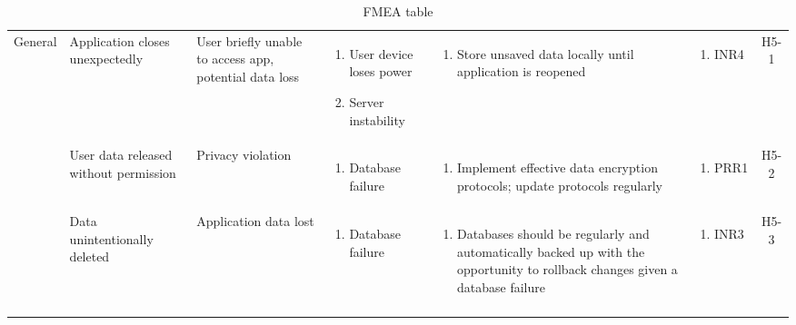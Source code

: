 \documentclass{article}
\begin{document}
\begin{longtable}{|p{1.7cm}|p{1.7cm} p{2.4cm} p{2.4cm} p{3.5cm} p{1.6cm} c|}
  \hline
  General & Application closes unexpectedly & User briefly unable to access app, potential data loss & \vspace*{-\baselineskip}\begin{enumerate}[label=\alph*., left=0pt, nosep]\item User device loses power \item Server instability  \end{enumerate} & \vspace*{-\baselineskip}\begin{enumerate}[label=\alph*., left=0pt, nosep] \item Store unsaved data locally until application is reopened  \end{enumerate} & \vspace*{-\baselineskip}\begin{enumerate}[label=\alph*., left=0pt, nosep] \item INR4 \end{enumerate} & H5-1\\
  \cline{2-7}
  & User data released without permission & Privacy violation & \vspace*{-\baselineskip}\begin{enumerate}[label=\alph*., left=0pt, nosep]\item Database failure \end{enumerate} & \vspace*{-\baselineskip}\begin{enumerate}[label=\alph*., left=0pt, nosep] \item Implement effective data encryption protocols; update protocols regularly \end{enumerate} & \vspace*{-\baselineskip}\begin{enumerate}[label=\alph*., left=0pt, nosep] \item PRR1 \end{enumerate} & H5-2\\
  \cline{2-7}
  & Data unintentionally deleted & Application data lost & \vspace*{-\baselineskip}\begin{enumerate}[label=\alph*., left=0pt, nosep]\item Database failure \end{enumerate} & \vspace*{-\baselineskip}\begin{enumerate}[label=\alph*., left=0pt, nosep] \item Databases should be regularly and automatically backed up with the opportunity to rollback changes given a database failure \end{enumerate} & \vspace*{-\baselineskip}\begin{enumerate}[label=\alph*., left=0pt, nosep] \item INR3 \end{enumerate} & H5-3\\
\hline
\caption{FMEA table}
\end{longtable}
\end{document}
